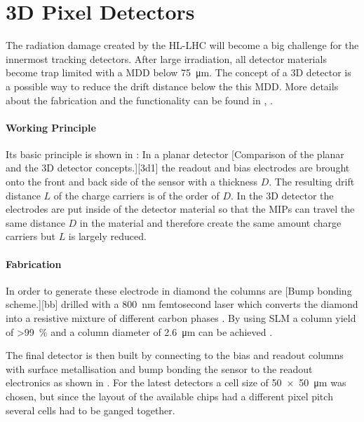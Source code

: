 \section{3D Pixel Detectors}

The radiation damage created by the \ac{HL-LHC} will become a big challenge for the innermost tracking detectors. 
After large irradiation, all detector materials become trap limited with a \ac{MDD} below \SI{75}{\micro\meter}. The concept of a 3D detector is a possible way to reduce the drift distance below the this \ac{MDD}. More details about the fabrication and the functionality can be found in \cite{3D}, \cite{parker}.\par
\paragraph{Working Principle}
Its basic principle is shown in : In a planar detector 
[Comparison of the planar and the 3D detector concepts.][3d1]
the readout and bias electrodes are brought onto the front and back side of the sensor with a thickness $D$. The resulting drift distance $L$ of the charge carriers is of the order of $D$. In the 3D detector the electrodes are put inside of the detector material so that the \acp{MIP} can travel the same distance $D$ in the material and therefore create the same amount charge carriers but $L$ is largely reduced.\par
\paragraph{Fabrication}
In order to generate these electrode in diamond the columns are 
[Bump bonding scheme.][bb]
drilled with a \SI{800}{\nano\meter} femtosecond laser which converts the diamond into a resistive mixture of different carbon phases \cite{3dfab}. By using \ac{SLM} a column yield of \SI{>99}{\%} and a column diameter of \SI{2.6}{\micro\meter} can be achieved \cite{slm}.\par
The final detector is then built by connecting to the bias and readout columns with surface metallisation and bump bonding the sensor to the readout electronics as shown in . For the latest detectors a cell size of \SI{50x50}{\micro\meter} was chosen, but since the layout of the available chips had a different pixel pitch several cells had to be ganged together.\par
